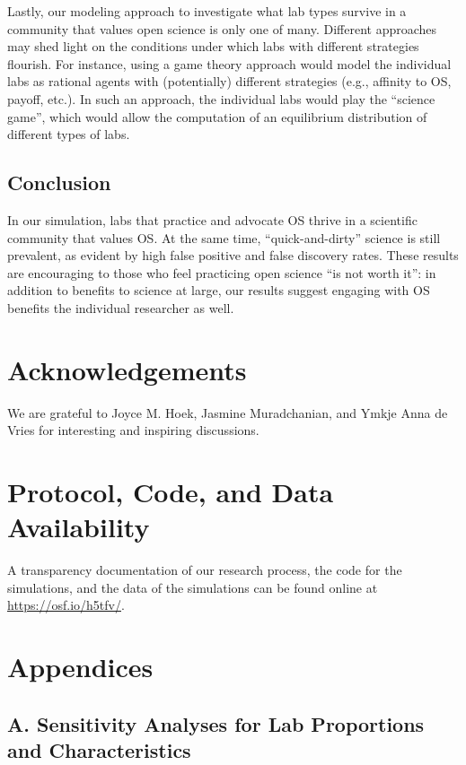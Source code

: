 \documentclass[meta, authordate,issue]{jote-new-article}
\begin{document}
Lastly, our modeling approach to investigate what lab types survive in a community that values open science is only one of many. Different approaches may shed light on the conditions under which labs with different strategies flourish. For instance, using a game theory approach would model the individual labs as rational agents with (potentially) different strategies (e.g., affinity to OS, payoff, etc.). In such an approach, the individual labs would play the ``science game'', which would allow the computation of an equilibrium distribution of different types of labs.

\subsection{Conclusion}

In our simulation, labs that practice and advocate OS thrive in a scientific community that values OS. At the same time, ``quick-and-dirty'' science is still prevalent, as evident by high false positive and false discovery rates. These results are encouraging to those who feel practicing open science ``is not worth it'': in addition to benefits to science at large, our results suggest engaging with OS benefits the individual researcher as well.

\section{Acknowledgements}

We are grateful to Joyce M. Hoek, Jasmine Muradchanian, and Ymkje Anna de Vries for interesting and inspiring discussions.

\section{Protocol, Code, and Data Availability}

A transparency documentation of our research process, the code for the simulations, and the data of the simulations can be found online at \href{https://osf.io/h5tfv/}{https://osf.io/h5tfv/}.

\printbibliography

\newpage
\onecolumn
\appendix

\section{Appendices}
\subsection{A. Sensitivity Analyses for Lab Proportions and Characteristics}\label{sec:appendix_a}
\end{document}

